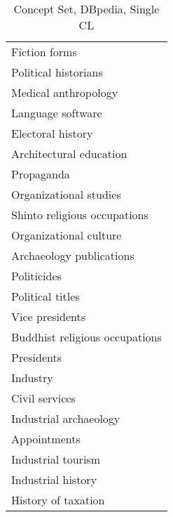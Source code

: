 \begin{table*}[h]
\begin{minipage}{0.48\textwidth}
\begin{tabular}{|l|}
Fiction forms \\
Political historians \\
Medical anthropology \\
Language software \\
Electoral history \\
Architectural education \\
Propaganda \\
Organizational studies \\
Shinto religious occupations \\
Organizational culture \\
Archaeology publications \\
Politicides \\
Political titles \\
Vice presidents \\
Buddhist religious occupations \\
Presidents \\
Industry \\
Civil services \\
Industrial archaeology \\
Appointments \\
Industrial tourism \\
Industrial history \\
History of taxation \\
\hline
\end{tabular}
\end{minipage}

\caption{Concept Set, DBpedia, Single CL}
\label{tab:db4}
\end{table*}
